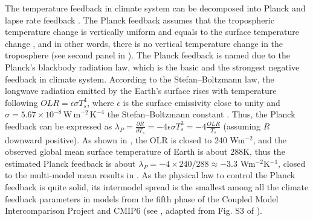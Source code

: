 The temperature feedback in climate system can be decomposed into Planck and lapse rate feedback \citep{Soden2006}. The Planck feedback assumes that the tropospheric temperature change is vertically uniform and equals to the surface temperature change \citep{Bony2006,Soden2006}, and in other words, there is no vertical temperature change in the troposphere (see second panel in ). The Planck feedback is named due to the Planck's blackbody radiation law, which is the basic and the strongest negative feedback in climate system. According to the Stefan--Boltzmann law, the longwave radiation emitted by the Earth’s surface rises with temperature following $OLR=\epsilon\sigma T_s^4$, where $\epsilon$ is the surface emissivity close to unity and $\sigma=5.67\times 10^{-8}\, \mathrm{W\, m^{-2}\,K^{-4}}$ the Stefan--Boltzmann constant \citep{Pithan2014}. Thus, the Planck feedback can be expressed as $\lambda_P = \frac{\partial R}{\partial T_s}=-4\epsilon\sigma T_s^3=-4\frac{OLR}{T_s}$ (assuming $R$ downward positive). As shown in , the OLR is closed to 240 Wm$^{-2}$, and the observed global mean surface temperature of Earth is about 288K, thus the estimated Planck feedback is about $\lambda_P=-4\times 240/288\approx -3.3$ Wm$^{-2}$K$^{-1}$, closed to the multi-model mean results in . As the physical law to control the Planck feedback is quite solid, its intermodel spread is the smallest among all the climate feedback parameters in models from the fifth phase of the Coupled Model Intercomparison Project \citep[CMIP5;][]{Taylor2012overview} and CMIP6 \citep{Eyring2016overview}
(see , adapted from Fig. S3 of \citealt{Zelinka2020causes}).

